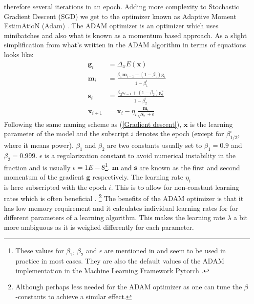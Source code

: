therefore several iterations in an epoch.
Adding more complexity to Stochastic Gradient Descent (SGD) we get to the optimizer 
known as Adaptive Moment EstimAtioN (Adam) \cite{adam}. The ADAM optimizer is 
an optimizer which uses minibatches and also what is known as a momentum based approach.
As a slight simplification from what's written in \cite{fysstkweek40} the ADAM 
algorithm in terms of equations looks like:
\begin{align}
    \mathbf{g}_i &= \Delta_x E(\bm{x}) \\
    \bm{m}_i &= \frac{\beta_1 \bm{m}_{i-1} + (1 - \beta_1)\bm{g}_i}{1 - \beta_1^i} \\
    \bm{s}_i &= \frac{\beta_2 \bm{s}_{i-1} + (1-\beta_2)\bm{g}^2_i}{1 - \beta_2^i} \\
    \bm{x}_{i+1} &= \bm{x}_i - \eta_i \frac{\bm{m}_i}{\sqrt{\bm{s}_i}+ \epsilon}
\end{align}
Following the same naming scheme as (\ref{Gradient descent}), $\bm{x}$ is the 
learning parameter of the model and the subscript $i$ denotes the epoch (except 
for $\beta_{1/2}^i$, where it means power). 
$\beta_1$ and $\beta_2$ are two constants usually set to $\beta_1 = 0.9$ and 
$\beta_2 = 0.999$. $\epsilon$ is a regularization constant to avoid numerical 
instability in the fraction and is usually $\epsilon=1E-8$\footnote{These values 
for $\beta_1$, $\beta_2$ and $\epsilon$ are mentioned in \cite{adam} and seem 
to be used in practice in most cases. They are also the default values of the 
ADAM implementation in the Machine Learning Framework Pytorch \cite{NEURIPS2019_9015}.}.
$\bm{m}$ and $\bm{s}$ are known as the first and second momentum of the gradient 
$\bm{g}$ respectively. The learning rate $\eta_i$\\ is here subscripted with the 
epoch $i$. This is to allow for non-constant learning rates which is often beneficial \citationneeded.
\footnote{Although perhaps less needed for the ADAM optimizer as one can tune the 
$\beta$-constants to achieve a similar effect.}
The benefits of the ADAM optimizer is that it has low memory requirement and it calculates 
individual learning rates for for different parameters of a learning algorithm. 
This makes the learning rate $\lambda$ a bit more ambiguous as it is weighed 
differently for each parameter.
